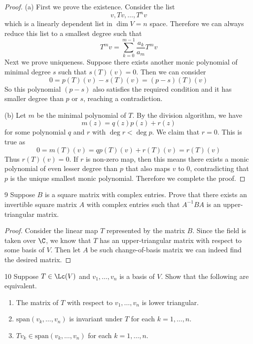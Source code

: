 \documentclass{extarticle}
\begin{document}
\begin{proof}
(a) First we prove the existence. Consider the list 
\[v, Tv, \ldots, T^n v\] 
which is a linearly dependent list in \(\dim V = n\) space. Therefore we can always reduce this list 
to a smallest degree such that 
\[T^m v = \sum_{k=0}^{m-1}\frac{a_k}{a_m}T^m v\]
Next we prove uniqueness. Suppose there exists another monic polynomial of minimal degree 
\(s\) such that \(s(T)(v) = 0\). Then we can consider 
\[0 = p(T)(v) - s(T)(v) = (p - s)(T)(v)\]
So this polynomial \((p - s)\) also satisfies the required condition and it has smaller degree 
than \(p\) or \(s\), reaching a contradiction. 

(b) Let \(m\) be the minimal polynomial of \(T\). By the division algorithm, we have 
\[m(z) = q(z)p(z) + r(z)\]
for some polynomial \(q\) and \(r\) with \(\deg r < \deg p\). We claim that \(r = 0\). This is true as 
\[0 = m(T)(v) = qp(T)(v) + r(T)(v) = r(T)(v)\]
Thus \(r(T)(v) = 0\). If \(r\) is non-zero map, then this means there exists a monic polynomial of even 
lesser degree than \(p\) that also maps \(v\) to 0, 
contradicting that \(p\) is the unique smallest monic polynomial. Therefore we complete the proof.
\end{proof}

\begin{problem}{9}
    Suppose \(B\) is a square matrix with complex entries. Prove that there exists an invertible square 
    matrix \(A\) with complex entries such that \(A^{-1}BA\) is an upper-triangular matrix.
\end{problem}

\begin{proof}
Consider the linear map \(T\) represented by the matrix \(B\). Since the field is taken over \(\C\), we know 
that \(T\) has an upper-triangular matrix with respect to some basis of \(V\). Then let \(A\) be such 
change-of-basis matrix we can indeed find the desired matrix. 
\end{proof}

\begin{problem}{10}
    Suppose \(T \in \Lc(V)\) and \(v_1, \ldots, v_n\) is a basis of \(V\). Show that the following are 
    equivalent. 

    \begin{enumerate}[label=(\alph*)]
        \item The matrix of \(T\) with respect to \(v_1, \ldots, v_n\) is lower triangular. 
        \item \(\text{span}(v_k, \ldots, v_n)\) is invariant under \(T\) for each \(k = 1, \ldots, n\). 
        \item \(Tv_k \in \text{span}(v_k, \ldots, v_n)\) for each \(k = 1, \ldots, n\).
    \end{enumerate}
\end{problem}
\end{document}
